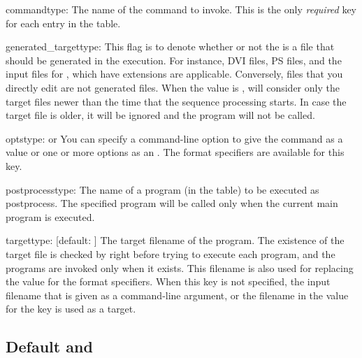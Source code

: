 \documentclass{llmk-doc}
\begin{document}
\begin{confkey}{command}{type: }
The name of the command to invoke. This is the only \emph{required} key for
each entry in the  table.
\end{confkey}

\begin{confkey}{generated\_target}{type: }
This flag is to denote whether or not the  is a file that should
be generated in the  execution. For instance, DVI files, PS files,
and the input files for , which have  extensions are
applicable. Conversely, files that you directly edit are not generated files.
When the value is ,  will consider only the target files
newer than the time that the sequence processing starts. In case the target
file is older, it will be ignored and the program will not be called.
\end{confkey}

\begin{confkey}{opts}{type:  or }
You can specify a command-line option to give the command as a 
value or one or more options as an . The format
specifiers are available for this key.
\end{confkey}

\begin{confkey}{postprocess}{type: }
The name of a program (in the  table) to be executed as
postprocess. The specified program will be called only when the current main
program is executed.
\end{confkey}

\begin{confkey}{target}{type: }[default: ]
The target filename of the program. The existence of the target file is checked
by  right before trying to execute each program, and the programs
are invoked only when it exists. This filename is also used for replacing the
value for the format specifiers. When this key is not specified, the input
filename that is given as a command-line argument, or the filename in the value
for the  key is used as a target.
\end{confkey}

\subsection{Default  and }
\end{document}
